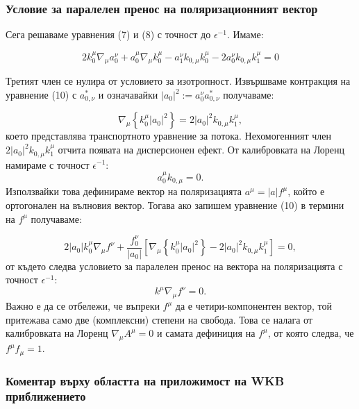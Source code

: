 \subsubsection{Условие за паралелен пренос на поляризационният вектор}

Сега решаваме уравнения (7) и (8) с точност до $\epsilon^{-1}$. Имаме:

\begin{equation}
	2 k_0^\mu\nabla_\mu a_0^\nu + a_0^\mu\nabla_\mu k^\mu_0 - a_1^\nu k_{0,\mu} k^\mu_0 - 2 a_0^\nu k_{0,\mu}k^\mu_1 = 0
\end{equation}

Третият член се нулира от условието за изотропност. Извършваме контракция на уравнение (10) с $a^*_{0,\nu}$ и означавайки $|a_0|^2 := a^\nu_0 a^*_{0,\nu}$ получаваме:

\begin{equation}
	\nabla_\mu\left\{k_0^\mu |a_0|^2\right\} = 2  |a_0|^2 k_{0,\mu}k_1^\mu,
\end{equation}
което представлява транспортното уравнение за потока. Нехомогенният член $2  |a_0|^2 k_{0,\mu}k_1^\mu$ отчита появата на дисперсионен ефект.
От калибровката на Лоренц намираме с точност $\epsilon^{-1}$:
\begin{equation}\label{a_orthog_k}
	a_0^\mu k_{0,\mu} = 0.
\end{equation}
Използвайки това дефинираме вектор на поляризацията $a^\mu = |a|f^\mu$, който е ортогонален на вълновия вектор. Тогава ако запишем уравнение (10) в термини на $f^\mu$ получаваме:

\begin{equation}
	2|a_0|k_0^\mu\nabla_\mu f^\nu + \frac{f^\nu_0}{|a_0|}\left[\nabla_\mu\left\{k_0^\mu |a_0|^2\right\} - 2  |a_0|^2 k_{0,\mu}k_1^\mu\right] = 0,
\end{equation}
от където следва условието за паралелен пренос на вектора на поляризацията с точност $\epsilon^{-1}$:
\begin{equation}
	k^\mu\nabla_\mu f^\nu = 0.
\end{equation}
Важно е да се отбележи, че въпреки $f^\mu$ да е четири-компонентен вектор, той притежава само две (комплексни) степени на свобода. Това се налага от калибровката на Лоренц $\nabla_\mu A^\mu = 0$ и самата дефиниция на $f^\mu$, от която следва, че $f^\mu f_\mu = 1$.

\subsubsection{Коментар върху областта на приложимост на WKB приближението}

